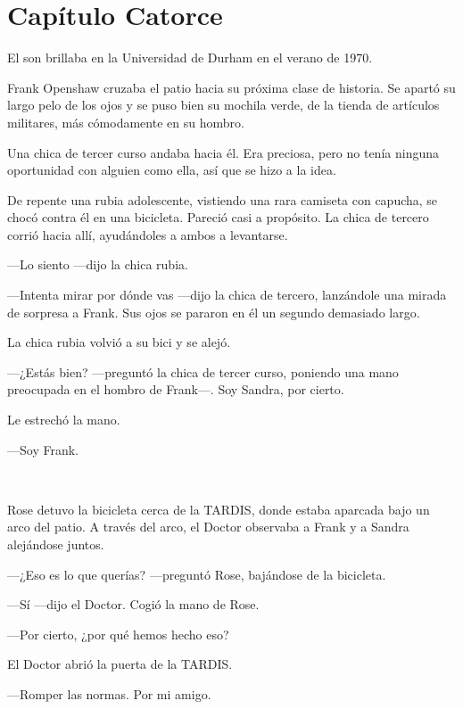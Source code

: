 \chapter*{Capítulo Catorce}

El son brillaba en la Universidad de Durham en el verano de 1970.

Frank Openshaw cruzaba el patio hacia su próxima clase de historia. Se
apartó su largo pelo de los ojos y se puso bien su mochila verde, de la
tienda de artículos militares, más cómodamente en su hombro.

Una chica de tercer curso andaba hacia él. Era preciosa, pero no tenía
ninguna oportunidad con alguien como ella, así que se hizo a la idea.

De repente una rubia adolescente, vistiendo una rara camiseta con
capucha, se chocó contra él en una bicicleta. Pareció casi a propósito.
La chica de tercero corrió hacia allí, ayudándoles a ambos a levantarse.

---Lo siento ---dijo la chica rubia.

---Intenta mirar por dónde vas ---dijo la chica de tercero, lanzándole una
mirada de sorpresa a Frank. Sus ojos se pararon en él un segundo
demasiado largo.

La chica rubia volvió a su bici y se alejó.

---¿Estás bien? ---preguntó la chica de tercer curso, poniendo una mano
preocupada en el hombro de Frank---. Soy Sandra, por cierto.

Le estrechó la mano.

---Soy Frank.

~

Rose detuvo la bicicleta cerca de la TARDIS, donde estaba aparcada bajo
un arco del patio. A través del arco, el Doctor observaba a Frank y a
Sandra alejándose juntos.

---¿Eso es lo que querías? ---preguntó Rose, bajándose de la bicicleta.

---Sí ---dijo el Doctor. Cogió la mano de Rose.

---Por cierto, ¿por qué hemos hecho eso?

El Doctor abrió la puerta de la TARDIS.

---Romper las normas. Por mi amigo.
